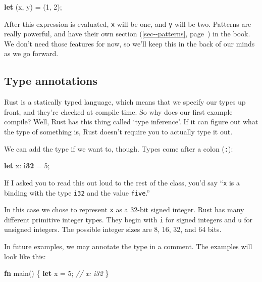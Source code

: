 \documentclass[a4paper,]{book}
\renewcommand*{\hyperref}[2][\ar]{%
  \def\ar{#2}%
  #2 (\autoref{#1}, page~\pageref{#1})}
\newenvironment{Shaded}{\begin{snugshade}}{\end{snugshade}}
\newcommand{\KeywordTok}[1]{\textcolor[rgb]{0.13,0.29,0.53}{\textbf{{#1}}}}
\newcommand{\DecValTok}[1]{\textcolor[rgb]{0.00,0.00,0.81}{{#1}}}
\newcommand{\CommentTok}[1]{\textcolor[rgb]{0.56,0.35,0.01}{\textit{{#1}}}}
\newcommand{\NormalTok}[1]{{#1}}
\begin{document}
\begin{Shaded}
\begin{Highlighting}[]
\KeywordTok{let} \NormalTok{(x, y) = (}\DecValTok{1}\NormalTok{, }\DecValTok{2}\NormalTok{);}
\end{Highlighting}
\end{Shaded}

After this expression is evaluated, \texttt{x} will be one, and
\texttt{y} will be two. Patterns are really powerful, and have
\hyperref[sec--patterns]{their own section} in the book. We don't need
those features for now, so we'll keep this in the back of our minds as
we go forward.

\subsection{Type annotations}\label{type-annotations}

Rust is a statically typed language, which means that we specify our
types up front, and they're checked at compile time. So why does our
first example compile? Well, Rust has this thing called `type
inference'. If it can figure out what the type of something is, Rust
doesn't require you to actually type it out.

We can add the type if we want to, though. Types come after a colon
(\texttt{:}):

\begin{Shaded}
\begin{Highlighting}[]
\KeywordTok{let} \NormalTok{x: }\KeywordTok{i32} \NormalTok{= }\DecValTok{5}\NormalTok{;}
\end{Highlighting}
\end{Shaded}

If I asked you to read this out loud to the rest of the class, you'd say
``\texttt{x} is a binding with the type \texttt{i32} and the value
\texttt{five}.''

In this case we chose to represent \texttt{x} as a 32-bit signed
integer. Rust has many different primitive integer types. They begin
with \texttt{i} for signed integers and \texttt{u} for unsigned
integers. The possible integer sizes are 8, 16, 32, and 64 bits.

In future examples, we may annotate the type in a comment. The examples
will look like this:

\begin{Shaded}
\begin{Highlighting}[]
\KeywordTok{fn} \NormalTok{main() \{}
    \KeywordTok{let} \NormalTok{x = }\DecValTok{5}\NormalTok{; }\CommentTok{// x: i32}
\NormalTok{\}}
\end{Highlighting}
\end{Shaded}
\end{document}
